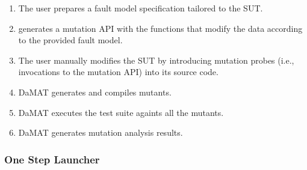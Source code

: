 \begin{enumerate}
	\item The user prepares a fault model specification tailored to the SUT.
	\item \DAMA generates a mutation API with the functions that modify the data according to the provided fault model.
	\item The user manually modifies the SUT by introducing mutation probes (i.e., invocations to the mutation API) into its source code.
	\item DaMAT generates and compiles mutants.
	\item DaMAT executes the test suite againts all the mutants.
	\item DaMAT generates mutation analysis results.
\end{enumerate}
%
%
%
%
%
%
%
%
%
%
%
%
%
%
%

\subsubsection{One Step Launcher}

